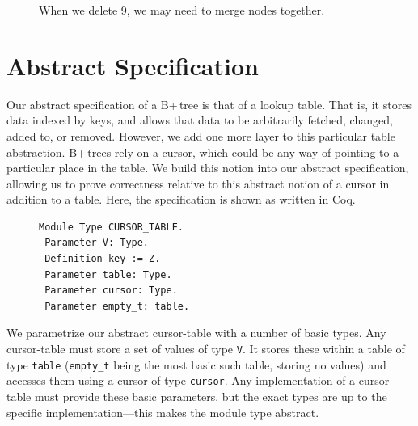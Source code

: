 \documentclass[a4paper,12pt]{article}
\begin{document}
\begin{figure}[h]
    \centering
    \caption{When we delete 9, we may need to merge nodes together.}
    \label{fig:demotree4}
\end{figure}

\clearpage

\section{Abstract Specification} \label{sec:spec}

Our abstract specification of a B+\,tree is that of a lookup table. That is, it stores data indexed by keys, and allows that data to be arbitrarily fetched, changed, added to, or removed. However, we add one more layer to this particular table abstraction. B+\,trees rely on a cursor, which could be any way of pointing to a particular place in the table. We build this notion into our abstract specification, allowing us to prove correctness relative to this abstract notion of a cursor in addition to a table. Here, the specification is shown as written in Coq.

\begin{figure}[h]
\begin{singlespace}
\begin{verbatim}
Module Type CURSOR_TABLE.
 Parameter V: Type.
 Definition key := Z.
 Parameter table: Type.
 Parameter cursor: Type.
 Parameter empty_t: table.
\end{verbatim}
\end{singlespace}
\end{figure}

We parametrize our abstract cursor-table with a number of basic types. Any cursor-table must store a set of values of type \texttt{V}. It stores these within a table of type \texttt{table} (\texttt{empty\_t} being the most basic such table, storing no values) and accesses them using a cursor of type \texttt{cursor}. Any implementation of a cursor-table must provide these basic parameters, but the exact types are up to the specific implementation---this makes the module type abstract.
\end{document}
